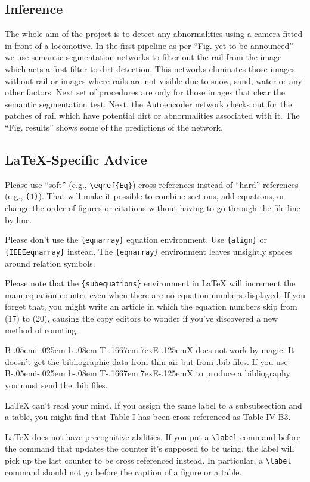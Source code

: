 \documentclass[conference]{IEEEtran}
\def\BibTeX{{\rm B\kern-.05em{\sc i\kern-.025em b}\kern-.08em
    T\kern-.1667em\lower.7ex\hbox{E}\kern-.125emX}}
\begin{document}
\subsection{Inference} \label{inference}
The whole aim of the project is to detect any abnormalities using a camera fitted in-front of a locomotive. In the first pipeline as per ``Fig. yet to be announced'' we use semantic segmentation networks to filter out the rail from the image which acts a first filter to dirt detection. This networks eliminates those images without rail or images where rails are not visible due to snow, sand, water or any other factors. Next set of procedures are only for those images that clear the semantic segmentation test. Next, the Autoencoder network checks out for the patches of rail which have potential dirt or abnormalities associated with it. The ``Fig. results'' shows some of the predictions of the network. 
\subsection{\LaTeX-Specific Advice}

Please use ``soft'' (e.g., \verb|\eqref{Eq}|) cross references instead
of ``hard'' references (e.g., \verb|(1)|). That will make it possible
to combine sections, add equations, or change the order of figures or
citations without having to go through the file line by line.

Please don't use the \verb|{eqnarray}| equation environment. Use
\verb|{align}| or \verb|{IEEEeqnarray}| instead. The \verb|{eqnarray}|
environment leaves unsightly spaces around relation symbols.

Please note that the \verb|{subequations}| environment in {\LaTeX}
will increment the main equation counter even when there are no
equation numbers displayed. If you forget that, you might write an
article in which the equation numbers skip from (17) to (20), causing
the copy editors to wonder if you've discovered a new method of
counting.

{\BibTeX} does not work by magic. It doesn't get the bibliographic
data from thin air but from .bib files. If you use {\BibTeX} to produce a
bibliography you must send the .bib files. 

{\LaTeX} can't read your mind. If you assign the same label to a
subsubsection and a table, you might find that Table I has been cross
referenced as Table IV-B3. 

{\LaTeX} does not have precognitive abilities. If you put a
\verb|\label| command before the command that updates the counter it's
supposed to be using, the label will pick up the last counter to be
cross referenced instead. In particular, a \verb|\label| command
should not go before the caption of a figure or a table.
\end{document}

